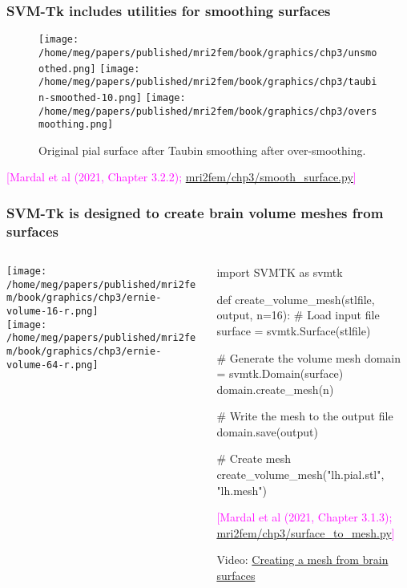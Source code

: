 \documentclass[10pt, mathserif, aspectratio=169, t, usenames, dvipsnames]{beamer}
\newcommand{\referself}[1]{\begin{flushright}{\tiny \textcolor{Magenta}{[#1]}}\end{flushright}}
\begin{document}
\begin{frame}
  \frametitle{SVM-Tk includes utilities for smoothing surfaces}
  \begin{figure}
  \centering
  \texttt{[image: /home/meg/papers/published/mri2fem/book/graphics/chp3/unsmoothed.png]}
  \texttt{[image: /home/meg/papers/published/mri2fem/book/graphics/chp3/taubin-smoothed-10.png]}
  \texttt{[image: /home/meg/papers/published/mri2fem/book/graphics/chp3/oversmoothing.png]}

  Original pial surface \hspace{3em} after Taubin smoothing \hspace{3em}
after over-smoothing.
  \end{figure}
  \bigskip
  
  \referself{Mardal et al (2021, Chapter 3.2.2); \href{https://github.com/kent-and/mri2fem/blob/master/mri2fem/mri2fem/chp3/smooth_surface.py}{mri2fem/chp3/smooth\_surface.py}}
\end{frame}

\begin{frame}[fragile]
\frametitle{SVM-Tk is designed to create brain volume meshes from surfaces}
\begin{columns}[T]
\begin{column}{0.34\textwidth}
  {\centering
  \texttt{[image: /home/meg/papers/published/mri2fem/book/graphics/chp3/ernie-volume-16-r.png]} \\
  \texttt{[image: /home/meg/papers/published/mri2fem/book/graphics/chp3/ernie-volume-64-r.png]}
  }
\end{column}
\begin{column}{0.65\textwidth}
  \begin{python}
import SVMTK as svmtk

def create_volume_mesh(stlfile, output, n=16):
    # Load input file
    surface = svmtk.Surface(stlfile)
    
    # Generate the volume mesh
    domain = svmtk.Domain(surface)
    domain.create_mesh(n)

    # Write the mesh to the output file
    domain.save(output)

# Create mesh    
create_volume_mesh("lh.pial.stl", "lh.mesh")
  \end{python}
  \referself{Mardal et al (2021, Chapter 3.1.3); \href{https://github.com/kent-and/mri2fem/blob/master/mri2fem/mri2fem/chp3/surface_to_mesh.py}{mri2fem/chp3/surface\_to\_mesh.py}}

  \medskip
  
\alert{Video: \href{https://youtu.be/tHGmzPqiYhQ}{Creating a mesh from brain surfaces}}

\end{column}

\end{columns}


\end{frame}
\end{document}
